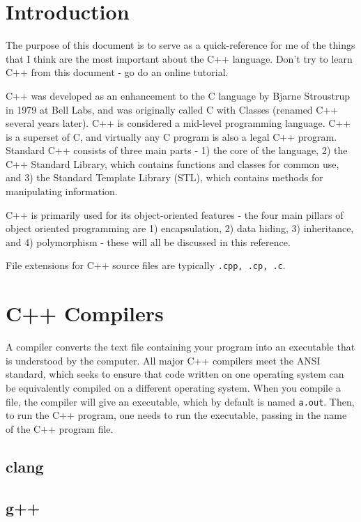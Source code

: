\documentclass[10pt]{article}
\begin{document}
\section{Introduction}

The purpose of this document is to serve as a quick-reference for me of the things that I think are the most important about the C++ language. Don't try to learn C++ from this document - go do an online tutorial.

C++ was developed as an enhancement to the C language by Bjarne Stroustrup in 1979 at Bell Labs, and was originally called C with Classes (renamed C++ several years later). C++ is considered a mid-level programming language. C++ is a superset of C, and virtually any C program is also a legal C++ program. Standard C++ consists of three main parts - 1) the core of the language, 2) the C++ Standard Library, which contains functions and classes for common use, and 3) the Standard Template Library (STL), which contains methods for manipulating information.

C++ is primarily used for its object-oriented features - the four main pillars of object oriented programming are 1) encapsulation, 2) data hiding, 3) inheritance, and 4) polymorphism - these will all be discussed in this reference.

File extensions for C++ source files are typically \texttt{.cpp, .cp, .c}.

\section{C++ Compilers}

A compiler converts the text file containing your program into an executable that is understood by the computer. All major C++ compilers meet the ANSI standard, which seeks to ensure that code written on one operating system can be equivalently compiled on a different operating system. When you compile a file, the compiler will give an executable, which by default is named \texttt{a.out}. Then, to run the C++ program, one needs to run the executable, passing in the name of the C++ program file. 

\subsection{clang}

\subsection{g++}
\end{document}
